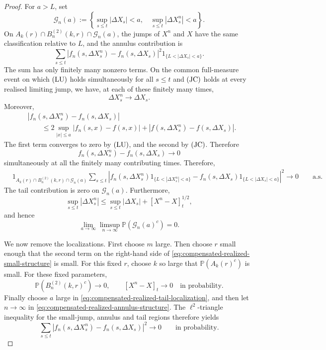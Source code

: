 \documentclass[a4paper,10pt]{article}
\begin{document}
\begin{proof}
For \(a>L\), set
\[
\mathcal G_n(a)
:=
\left\{
\sup_{s\le t}|\Delta X_s|<a,
\quad
\sup_{s\le t}|\Delta X^n_s|<a
\right\}.
\]
On \(A_k(r)\cap B_n^{(2)}(k,r)\cap\mathcal G_n(a)\), the jumps of
\(X^n\) and \(X\) have the same classification relative to \(L\), and
the annulus contribution is
\[
\sum_{s\le t}
\left|
f_n(s,\Delta X^n_s)-f_n(s,\Delta X_s)
\right|^2
1_{\{L<|\Delta X_s|<a\}}.
\]
The sum has only finitely many nonzero terms. On the common
full-measure event on which \({\rm (LU)}\) holds simultaneously for
all \(s\le t\) and \({\rm (JC)}\) holds at every realised limiting
jump, we have, at each of these finitely many times,
\[
        \Delta X^n_s\longrightarrow\Delta X_s.
\]
Moreover,
\[
\begin{aligned}
&|f_n(s,\Delta X^n_s)-f_n(s,\Delta X_s)|
\\
&\qquad\le
2\sup_{|x|\le a}|f_n(s,x)-f(s,x)|
+
|f(s,\Delta X^n_s)-f(s,\Delta X_s)|.
\end{aligned}
\]
The first term converges to zero by \({\rm (LU)}\), and the second by
\({\rm (JC)}\). Therefore
\[
        f_n(s,\Delta X^n_s)-f_n(s,\Delta X_s)
        \longrightarrow0
\]
simultaneously at all the finitely many contributing times.
Therefore,
\begin{align}
&1_{A_k(r)\cap B_n^{(2)}(k,r)\cap\mathcal G_n(a)}
\sum_{s\le t}
\left|
f_n(s,\Delta X^n_s)1_{\{L<|\Delta X^n_s|<a\}}
-
f_n(s,\Delta X_s)1_{\{L<|\Delta X_s|<a\}}
\right|^2
\longrightarrow0
\qquad\text{a.s.}
\label{eq:compensated-realized-annulus-structure}
\end{align}
The tail contribution is zero on \(\mathcal G_n(a)\). Furthermore,
\[
\sup_{s\le t}|\Delta X^n_s|
\le
\sup_{s\le t}|\Delta X_s|
+
[X^n-X]_t^{1/2},
\]
and hence
\begin{equation}
\lim_{a\to\infty}
\limsup_{n\to\infty}
\mathbb P(\mathcal G_n(a)^c)
=0.
\label{eq:compensated-realized-tail-localization}
\end{equation}

We now remove the localizations. First choose \(m\) large. Then choose
\(r\) small enough that the second term on the right-hand side of
\eqref{eq:compensated-realized-small-structure} is small. For this fixed
\(r\), choose \(k\) so large that
$
        \mathbb P(A_k(r)^c)
$
is small. For these fixed parameters,
\[
        \mathbb P(B_n^{(2)}(k,r)^c)\longrightarrow0,
        \qquad
        [X^n-X]_t\longrightarrow0
        \quad\text{in probability}.
\]
Finally choose \(a\) large in
\eqref{eq:compensated-realized-tail-localization}, and then let
\(n\to\infty\) in
\eqref{eq:compensated-realized-annulus-structure}. The
\(\ell^2\)-triangle inequality for the small-jump, annulus and tail
regions therefore yields
\begin{equation}
\sum_{s\le t}
\left|
f_n(s,\Delta X^n_s)-f_n(s,\Delta X_s)
\right|^2
\longrightarrow0
\qquad\text{in probability}.
\label{eq:compensated-realized-structure-convergence}
\end{equation}


\end{proof}
\end{document}
